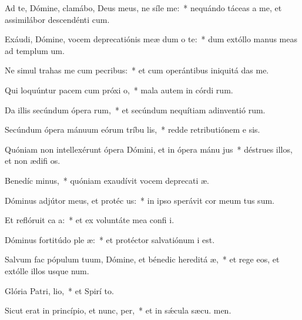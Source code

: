 \item Ad te, Dómine, clamábo, Deus meus, ne síle  me:~* nequándo táceas a me, et assimilábor descendénti  cum.
\item Exáudi, Dómine, vocem deprecatiónis meæ dum o  te:~* dum extóllo manus meas ad templum  um.
\item Ne simul trahas me cum pecribus:~* et cum operántibus iniquitá  das me.
\item Qui loquúntur pacem cum próxi o,~* mala autem in córdi rum.
\item Da illis secúndum ópera rum,~* et secúndum nequítiam adinventió rum.
\item Secúndum ópera mánuum eórum tríbu lis,~* redde retributiónem e sis.
\item Quóniam non intellexérunt ópera Dómini, et in ópera mánu jus~* déstrues illos, et non ædifi os.
\item Benedíc minus,~* quóniam exaudívit vocem deprecati æ.
\item Dóminus adjútor meus, et protéc us:~* in ipso sperávit cor meum  tus sum.
\item Et reflóruit ca a:~* et ex voluntáte mea confi i.
\item Dóminus fortitúdo ple æ:~* et protéctor salvatiónum  i est.
\item Salvum fac pópulum tuum, Dómine, et bénedic hereditá æ,~* et rege eos, et extólle illos usque  num.
\item Glória Patri,  lio,~* et Spirí to.
\item Sicut erat in princípio, et nunc,  per,~* et in sǽcula sæcu. men.
